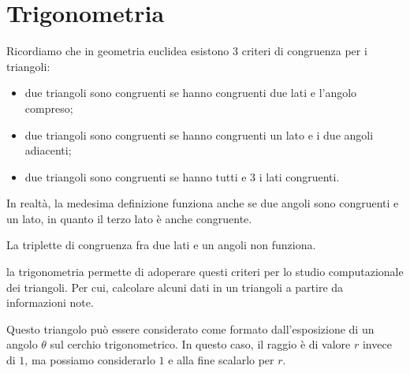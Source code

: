 \documentclass[a4paper]{article}
\begin{document}
\pagebreak

\section{Trigonometria}

Ricordiamo che in geometria euclidea esistono 3 criteri di congruenza per i triangoli:
\begin{itemize}
    \item due triangoli sono congruenti se hanno congruenti due lati e l'angolo compreso;
    \item due triangoli sono congruenti se hanno congruenti un lato e i due angoli adiacenti;
    \item due triangoli sono congruenti se hanno tutti e 3 i lati congruenti.
\end{itemize}

In realtà, la medesima definizione funziona anche se due angoli sono congruenti e un lato, in quanto
il terzo lato è anche congruente.

La triplette di congruenza fra due lati e un angoli non funziona.

la trigonometria permette di adoperare questi criteri per lo studio computazionale dei triangoli.
Per cui, calcolare alcuni dati in un triangoli a partire da informazioni note.

\begin{center}
\end{center}

Questo triangolo può essere considerato come formato dall'esposizione di un angolo \(\theta\)
sul cerchio trigonometrico.
In questo caso, il raggio è di valore \(r\) invece di \(1\), ma possiamo considerarlo \(1\)
e alla fine scalarlo per \(r\).
\end{document}
